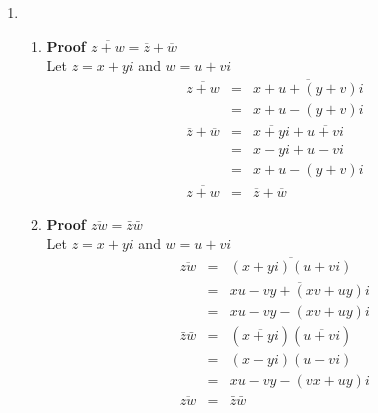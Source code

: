 \documentclass{article}%
\newenvironment{proof}[1][]{\begin{samepage}\textbf{Proof #1} }{\end{samepage}}
\begin{document}
\begin{enumerate}
\begin{enumerate}[label*=\arabic*.]
\begin{enumerate}[label=\alph*]
\begin{proof}[$r(wz)=(rw)z$]
\begin{eqnarray*}
                         &=&pux-pvy-qvx-quy+(puy-qvy+pvx+qux)i \\
                    r(wz)&=&(rw)z 
               \end{eqnarray*}
            \end{proof}
        \end{enumerate}
        \item
        \begin{enumerate}[label=\alph*]
            \item
            \begin{proof}[$\overline{z+w}=\overline{z}+\overline{w}$]
                \\ Let $z=x+yi$ and $w=u+vi$
                \begin{eqnarray*}
                    \overline{z+w}&=&\overline{x+u+(y+v)i} \\
                                  &=&x+u-(y+v)i \\
                    \overline{z}+\overline{w}&=&\overline{x+yi}+\overline{u+vi} \\
                                             &=&x-yi+u-vi \\
                                             &=&x+u-(y+v)i \\
                    \overline{z+w}&=&\overline{z}+\overline{w}
                \end{eqnarray*}
            \end{proof}
            \item
            \begin{proof}[$\overline{zw}=\bar{z}\bar{w}$]
                \\ Let $z=x+yi$ and $w=u+vi$
                \begin{eqnarray*}
                    \overline{zw}&=&\overline{(x+yi)(u+vi)} \\
                                 &=&\overline{xu-vy+(xv+uy)i} \\
                                 &=&xu-vy-(xv+uy)i \\
                    \bar{z}\bar{w}&=&(\overline{x+yi})(\overline{u+vi}) \\
                                  &=&(x-yi)(u-vi) \\
                                  &=&xu-vy-(vx+uy)i \\
                    \overline{zw}&=&\bar{z}\bar{w}
                \end{eqnarray*}
            \end{proof}

\end{enumerate}
\end{enumerate}
\end{enumerate}
\end{document}
